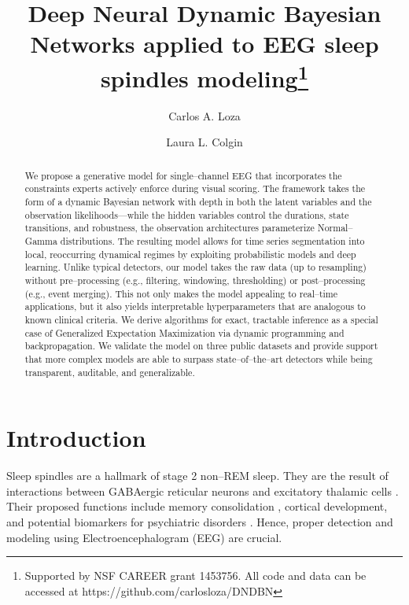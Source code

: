 \documentclass[runningheads]{llncs}
\begin{document}
\title{Deep Neural Dynamic Bayesian Networks applied to EEG sleep spindles modeling\thanks{Supported by NSF CAREER grant 1453756. All code and data can be accessed at https://github.com/carlosloza/DNDBN}}
\author{Carlos A. Loza \and
	Laura L. Colgin}


\maketitle
\begin{abstract}
We propose a generative model for single--channel EEG that incorporates the constraints experts actively enforce during visual scoring. The framework takes the form of a dynamic Bayesian network with depth in both the latent variables and the observation likelihoods---while the hidden variables control the durations, state transitions, and robustness, the observation architectures parameterize Normal--Gamma distributions. The resulting model allows for time series segmentation into local, reoccurring dynamical regimes by exploiting probabilistic models and deep learning. Unlike typical detectors, our model takes the raw data (up to resampling) without pre--processing (e.g., filtering, windowing, thresholding) or post--processing (e.g., event merging). This not only makes the model appealing to real--time applications, but it also yields interpretable hyperparameters that are analogous to known clinical criteria. We derive algorithms for exact, tractable inference as a special case of Generalized Expectation Maximization via dynamic programming and backpropagation. We validate the model on three public datasets and provide support that more complex models are able to surpass state--of--the--art detectors while being transparent, auditable, and generalizable.
\end{abstract}
\section{Introduction}
\label{sec:intro}

Sleep spindles are a hallmark of stage 2 non--REM sleep. They are the result of interactions between GABAergic reticular neurons and excitatory thalamic cells \cite{steriade1993thalamocortical}. Their proposed functions include memory consolidation \cite{schabus2004sleep}, cortical development, and potential biomarkers for psychiatric disorders \cite{ferrarelli2007reduced}. Hence, proper detection and modeling using Electroencephalogram (EEG) are crucial.
\end{document}
